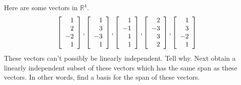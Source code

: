 \begin{enumialphparenastyle}
\begin{ex} Here are some vectors in $\mathbb{R}^{4}$. 
\begin{equation*}
\left[ 
\begin{array}{r}
1 \\ 
2 \\ 
-2 \\ 
1
\end{array}
\right] ,\left[ 
\begin{array}{r}
1 \\ 
3 \\ 
-3 \\ 
1
\end{array}
\right] ,\left[ 
\begin{array}{r}
1 \\ 
-1 \\ 
1 \\ 
1
\end{array}
\right] ,\left[ 
\begin{array}{r}
2 \\ 
-3 \\ 
3 \\ 
2
\end{array}
\right] ,\left[ 
\begin{array}{r}
1 \\ 
3 \\ 
-2 \\ 
1
\end{array}
\right]
\end{equation*}
These vectors can't possibly be linearly independent. Tell why. Next obtain a
linearly independent subset of these vectors which has the same span as
these vectors. In other words, find a basis for the span of these vectors.
\end{ex}


\end{enumialphparenastyle}
